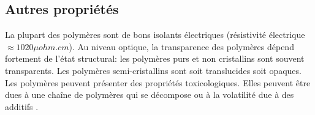 \subsection{Autres propri\'et\'es}
\par{
La plupart des polym\`eres sont de bons isolants \'electriques (r\'esistivit\'e \'electrique $\approx 1020 \mu ohm.cm$). Au niveau optique, la transparence des polym\`eres d\'epend fortement de l'\'etat structural: les polym\`eres purs et non cristallins sont souvent transparents. Les polym\`eres semi-cristallins sont soit translucides soit opaques. Les polym\`eres peuvent pr\'esenter des propri\'et\'es toxicologiques. Elles peuvent \^etre dues \`a une cha\^ine de polym\`eres qui se d\'ecompose ou \`a la volatilit\'e due \`a des additifs  {\citep{lecomte2009physique}}.
}